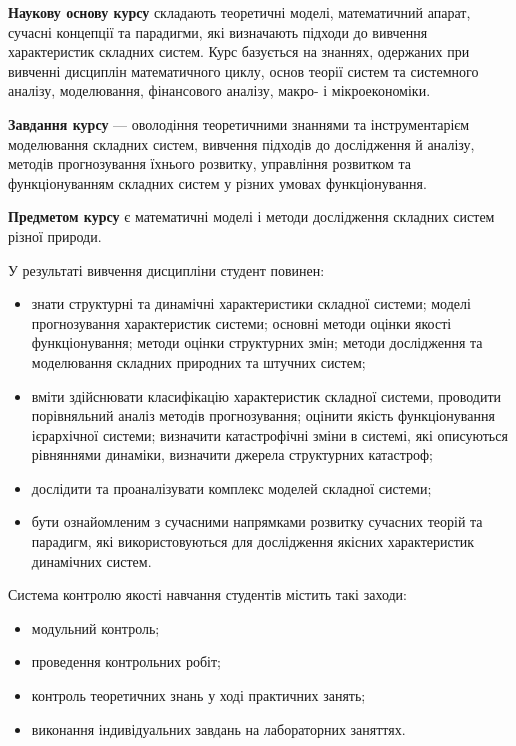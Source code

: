 \documentclass[
  letterpaper,
]{report}
\providecommand{\tightlist}{%
  \setlength{\itemsep}{0pt}\setlength{\parskip}{0pt}}\usepackage{longtable,booktabs,array}
\begin{document}
\textbf{Наукову основу курсу} складають теоретичні моделі, математичний
апарат, сучасні концепції та парадигми, які визначають підходи до
вивчення характеристик складних систем. Курс базується на знаннях,
одержаних при вивченні дисциплін математичного циклу, основ теорії
систем та системного аналізу, моделювання, фінансового аналізу, макро- і
мікроекономіки.

\textbf{Завдання курсу} --- оволодіння теоретичними знаннями та
інструментарієм моделювання складних систем, вивчення підходів до
дослідження й аналізу, методів прогнозування їхнього розвитку,
управління розвитком та функціонуванням складних систем у різних умовах
функціонування.

\textbf{Предметом курсу} є математичні моделі і методи дослідження
складних систем різної природи.

У результаті вивчення дисципліни студент повинен:

\begin{itemize}
\item
  знати структурні та динамічні характеристики складної системи; моделі
  прогнозування характеристик системи; основні методи оцінки якості
  функціонування; методи оцінки структурних змін; методи дослідження та
  моделювання складних природних та штучних систем;
\item
  вміти здійснювати класифікацію характеристик складної системи,
  проводити порівняльний аналіз методів прогнозування; оцінити якість
  функціонування ієрархічної системи; визначити катастрофічні зміни в
  системі, які описуються рівняннями динаміки, визначити джерела
  структурних катастроф;
\item
  дослідити та проаналізувати комплекс моделей складної системи;
\item
  бути ознайомленим з сучасними напрямками розвитку сучасних теорій та
  парадигм, які використовуються для дослідження якісних характеристик
  динамічних систем.
\end{itemize}

Система контролю якості навчання студентів містить такі заходи:

\begin{itemize}
\tightlist
\item
  модульний контроль;
\item
  проведення контрольних робіт;
\item
  контроль теоретичних знань у ході практичних занять;
\item
  виконання індивідуальних завдань на лабораторних заняттях.
\end{itemize}
\end{document}
